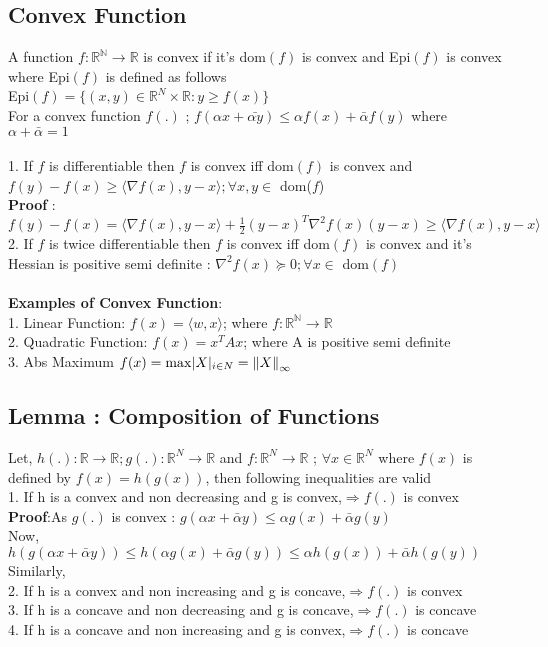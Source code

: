\documentclass[a4paper,english,12pt]{article}
\newcommand\tab[1][1cm]{\hspace*{#1}}
\begin{document}
\subsection{Convex Function} 
A function $f:\mathbb{R^N}\rightarrow\mathbb{R}$ is convex if it's dom$(f)$ is convex and Epi$(f)$ is convex where Epi$(f)$ is defined as follows \\
Epi$(f) = \{(x,y) \in \mathbb{R}^N \times \mathbb{R}: y \geq f(x)\}$\\
For a convex function $f(.)$ ; $f(\alpha x + \bar{\alpha y} ) \leq \alpha f(x) + \bar{\alpha} f(y)$ where $\alpha + \bar{\alpha} =1$ \\
\\
1. If $f$ is differentiable then $f$ is convex iff dom$(f)$ is convex and \\ $f(y) -f(x) \geq \langle\nabla f(x), y-x\rangle; \forall x,y \in$ dom($f$)\\
\textbf{Proof} : $ f(y) - f(x) = \langle\nabla f(x) , y-x\rangle + \frac{1}{2}(y-x)^T \nabla^2 f(x) (y-x) \geq \langle\nabla f(x) , y-x\rangle$\\
2. If $f$ is twice differentiable then $f$ is convex iff dom$(f)$ is convex and it's Hessian is positive semi definite : $\nabla^2 f(x)\succeq 0; \forall x \in$ dom$(f)$\\
\\\textbf{Examples of Convex Function}:\\
1. Linear Function:  $f(x) = \langle w,x\rangle$; where $f:\mathbb{R^N}\rightarrow\mathbb{R}$\\
2. Quadratic Function: $f(x) = x^TAx$; where A is positive semi definite \\
3. Abs Maximum $f(x) = \max \lvert X\rvert_{i \in N} = \left\lVert X\right\rVert_\infty$\\
\subsection{Lemma : Composition of Functions} 
Let, $h(.):\mathbb{R}\rightarrow\mathbb{R};g(.):\mathbb{R}^N\rightarrow\mathbb{R}$ and $f:\mathbb{R}^N\rightarrow\mathbb{R}$ ; $\forall x \in \mathbb{R}^N$ where $f(x)$ is defined by $f(x) = h(g(x))$, then following inequalities are valid\\
1. If h is a convex and non decreasing and g is convex,$\Longrightarrow f(.)$ is convex\\
\textbf{Proof}:\tab As $g(.)$ is convex :  $g(\alpha x + \bar{\alpha}y )\leq \alpha g(x) + \bar{\alpha} g(y)$ \\
\tab \tab Now, $h(g(\alpha x + \bar{\alpha}y ))\leq h(\alpha g(x) + \bar{\alpha} g(y))\leq \alpha h(g(x)) + \bar{\alpha} h(g(y))$\\
Similarly,\\
2. If h is a convex and non increasing and g is concave,$\Longrightarrow f(.)$ is convex\\
3. If h is a concave and non decreasing and g is concave,$\Longrightarrow f(.)$ is concave\\
4. If h is a concave and non increasing and g is convex,$\Longrightarrow f(.)$ is concave\\
\end{document}
